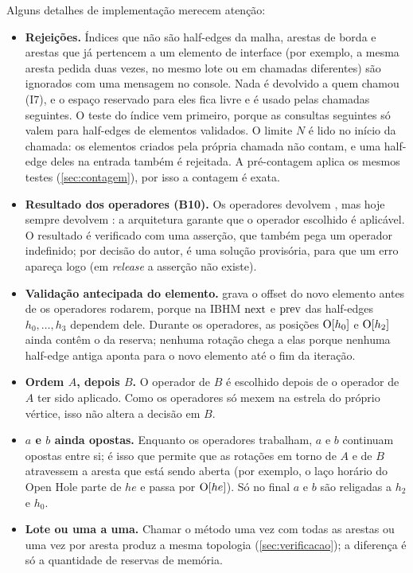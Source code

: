 Alguns detalhes de implementação merecem atenção:
\begin{itemize}
\item \textbf{Rejeições.} Índices que não são half-edges da malha, arestas de borda e arestas que já pertencem a um
elemento de interface (por exemplo, a mesma aresta pedida duas vezes, no mesmo lote ou em chamadas diferentes) são
ignorados com uma mensagem no console. Nada é devolvido a quem chamou (I7), e o espaço reservado para eles fica livre e
é usado pelas chamadas seguintes.
O teste do índice vem primeiro, porque as consultas seguintes só valem para half-edges de elementos validados. O limite
$N$ é lido no início da chamada: os elementos criados pela própria chamada não contam, e uma half-edge deles na entrada
também é rejeitada. A pré-contagem aplica os mesmos testes (\cref{sec:contagem}), por isso a contagem é exata.
\item \textbf{Resultado dos operadores (B10).} Os operadores devolvem , mas hoje sempre devolvem
: a arquitetura garante que o operador escolhido é aplicável. O resultado é verificado com uma asserção, que
também pega um operador indefinido; por decisão do autor, é uma solução provisória, para que um erro apareça logo
(em \emph{release} a asserção não existe).
\item \textbf{Validação antecipada do elemento.}  grava o offset do novo elemento antes de os
operadores rodarem, porque na IBHM $\mathrm{next}$ e $\mathrm{prev}$ das half-edges $h_0,\dots,h_3$ dependem dele. Durante os operadores,
as posições $\mathrm{O}[h_0]$ e $\mathrm{O}[h_2]$ ainda contêm o \BORDER{} da reserva; nenhuma rotação chega a elas porque nenhuma
half-edge antiga aponta para o novo elemento até o fim da iteração.
\item \textbf{Ordem $A$, depois $B$.} O operador de $B$ é escolhido depois de o operador de $A$ ter sido aplicado. Como
os operadores só mexem na estrela do próprio vértice, isso não altera a decisão em $B$.
\item \textbf{$a$ e $b$ ainda opostas.} Enquanto os operadores trabalham, $a$ e $b$ continuam opostas entre si; é isso
que permite que as rotações em torno de $A$ e de $B$ atravessem a aresta que está sendo aberta (por exemplo, o laço
horário do Open Hole parte de $he$ e passa por $\mathrm{O}[he]$). Só no final $a$ e $b$ são religadas a $h_2$ e $h_0$.
\item \textbf{Lote ou uma a uma.} Chamar o método uma vez com todas as arestas ou uma vez por aresta produz a mesma
topologia (\cref{sec:verificacao}); a diferença é só a quantidade de reservas de memória.
\end{itemize}

